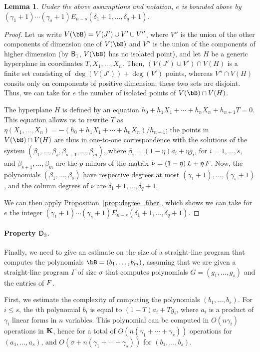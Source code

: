 \documentclass[12pt]{article}
\newtheorem{lemma}[definition]{Lemma}
\begin{document}
\begin{lemma}\label{lemma:columndegree:e_estimate}
  Under the above assumptions and notation, $e$ is bounded above by
  $(\gamma_1+1)\cdots(\gamma_s+1) E_{n-s}(\delta_1+1, \ldots, \delta_q+1)$.
\end{lemma}
\begin{proof}
Let us write $V(\bB)=V(J') \cup V' \cup V''$, where $V''$ is the union
of the other components of dimension one of $V(\bB)$ and $V''$ is the
union of the components of higher dimension (by $\mathsf{B}_1$, $V(\bB)$
has no isolated point), and let $H$ be a generic hyperplane in
coordinates $T,X_1,\dots,X_n$. Then, $(V(J') \cup V') \cap V(H)$ is a
finite set consisting of $\deg(V(J')) + \deg(V')$ points, whereas $V''
\cap V(H)$ consits only on components of positive dimension; these two
sets are disjoint. Thus, we can take for $e$ the number of isolated 
points of $V(\bB)\cap V(H)$.

The hyperplane $H$ is defined by an equation
$h_0 + h_1 X_1 + \cdots + h_{n}X_{n} + h_{n+1} T=0$. This equation
allows us to rewrite $T$ as
$\eta(X_1,\dots,X_n)=-(h_0 + h_1 X_1 + \cdots +
h_{n}X_{n})/h_{n+1}$;
the points in $V(\bB)\cap V(H)$ are thus in one-to-one correspondence
with the solutions of the system
$(\beta_1,\dots,\beta_s,\beta_{s+1},\dots,\beta_m)$, where
$\beta_i=(1-\eta) a_i + \eta g_i$, for $i=1,\dots,s$, and
$\beta_{s+1},\dots,\beta_m$ are the $p$-minors of the matrix
${\nu}=(1-\eta)\, {L} + \eta \, {F} $.  Now, the polynomials
$(\beta_1,\dots,\beta_s)$ have respective degrees at most
$(\gamma_1+1),\dots,(\gamma_s+1)$, and the column degrees of ${\nu}$
are $\delta_1+1,\dots,\delta_q+1$.

We can then apply Proposition~\ref{prop:degree_fiber}, which shows we
can take for $e$ the integer $(\gamma_1+1)\cdots(\gamma_s+1)
E_{n-s}(\delta_1+1, \ldots, \delta_q+1)$.  
\end{proof}

\paragraph{Property $\mathsf{D}_3$.} Finally, we need to give an estimate on
the size of a straight-line program that computes the polynomials
$\bB=(b_1,\dots,b_m)$, assuming that we are given a straight-line
program $\Gamma$ of size $\sigma$ that computes polynomials $G=(g_1,\dots,g_s)$ and
the entries of ${F}$.

First, we estimate the complexity of computing the polynomials
$(b_1,\dots,b_s)$. For $i \le s$, the $i$th polynomial $b_i$ is equal
to $(1-T)a_i + T g_i$, where $a_i$ is a product of $\gamma_i$ linear
forms in $n$ variables. This polynomial can be computed in $O(n
\gamma_i)$ operations in $\mathbf{K}$, hence for a total of $O(n
(\gamma_1+\cdots+\gamma_s))$ operations for $(a_1,\dots,a_s)$, and $O(\sigma+n (\gamma_1+\cdots+\gamma_s))$ for $(b_1,\dots,b_s)$. 
\end{document}
